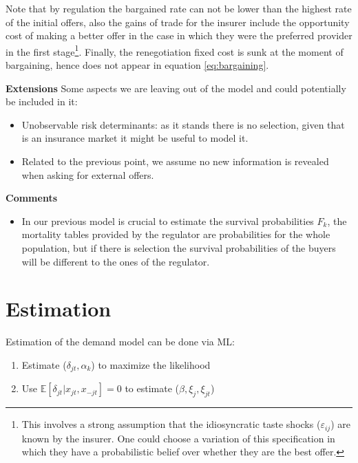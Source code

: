 \documentclass[12pt]{article}
\theoremstyle{plain}
\theoremstyle{plain}
\begin{document}


Note that by regulation the bargained rate can not be lower than the highest rate of the initial offers, also the gains of trade for the insurer include the opportunity cost of making a better offer in the case in which they were the preferred provider in the first stage\footnote{This involves a strong assumption that the idiosyncratic taste shocks ($\varepsilon_{ij}$) are known by the insurer. One could choose a variation of this specification in which they have a probabilistic belief over whether they are the best offer. }. Finally, the renegotiation fixed cost is sunk at the moment of bargaining, hence does not appear in equation \ref{eq:bargaining}. 

 




\textbf{Extensions}
Some aspects we are leaving out of the model and could potentially be included in it: 
\begin{itemize}
    \item Unobservable risk determinants: as it stands there is no selection, given that is an insurance market it might be useful to model it.

    \item Related to the previous point, we assume no new information is revealed when asking for external offers.
\end{itemize}



\textbf{Comments}
\begin{itemize}
    \item In our previous model is crucial to estimate the survival probabilities $F_k$, the mortality tables provided by the regulator are probabilities for the whole population, but if there is selection the survival probabilities of the buyers will be different to the ones of the regulator. 
\end{itemize}
\vspace{4cm}

\section{Estimation}
Estimation of the demand model can be done via ML: 
\begin{enumerate}
    \item Estimate  ($\delta_{jt}, \alpha_k$) to maximize the likelihood 
    \item Use $\mathbb{E}[\delta_{jt}|x_{jt},x_{-jt}]= 0$ to estimate ($\beta, \xi_j, \xi_{jt}$)
\end{enumerate}
\end{document}
